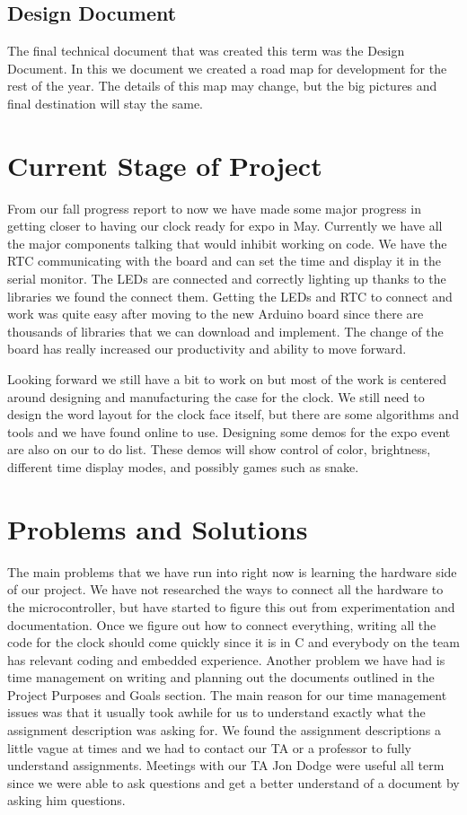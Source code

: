 \documentclass[onecolumn, draftclsnofoot,10pt, compsoc]{IEEEtran}
\begin{document}
\subsection{Design Document}
The final technical document that was created this term was the Design Document.
In this we document we created a road map for development for the rest of the year.
The details of this map may change, but the big pictures and final destination will stay the same.

\section{Current Stage of Project}
From our fall progress report to now we have made some major progress in getting closer to having our clock ready for expo in May. 
Currently we have all the major components talking that would inhibit working on code.
We have the RTC communicating with the board and can set the time and display it in the serial monitor. 
The LEDs are connected and correctly lighting up thanks to the libraries we found the connect them. 
Getting the LEDs and RTC to connect and work was quite easy after moving to the new Arduino board since there are thousands of libraries that we can download and implement. 
The change of the board has really increased our productivity and ability to move forward. 

Looking forward we still have a bit to work on but most of the work is centered around designing and manufacturing the case for the clock.
We still need to design the word layout for the clock face itself, but there are some algorithms and tools and we have found online to use. 
Designing some demos for the expo event are also on our to do list. 
These demos will show control of color, brightness, different time display modes, and possibly games such as snake. 

\section{Problems and Solutions}
The main problems that we have run into right now is learning the hardware side of our project.
We have not researched the ways to connect all the hardware to the microcontroller, but have started to figure this out from experimentation and documentation.
Once we figure out how to connect everything, writing all the code for the clock should come quickly since it is in C and everybody on the team has relevant coding and embedded experience.
Another problem we have had is time management on writing and planning out the documents outlined in the Project Purposes and Goals section.
The main reason for our time management issues was that it usually took awhile for us to understand exactly what the assignment description was asking for.
We found the assignment descriptions a little vague at times and we had to contact our TA or a professor to fully understand assignments.
Meetings with our TA Jon Dodge were useful all term since we were able to ask questions and get a better understand of a document by asking him questions.
\end{document}
